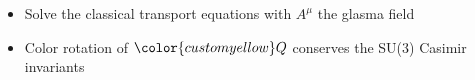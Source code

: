 \documentclass[aspectratio=169,11pt,usenames,dvipsnames]{beamer}
\begin{document}
\begin{frame}
    \begin{itemize}\itemsep0em 
        \item \begin{center}\footnotesize Solve the classical transport equations with {\color{starrysecond}$A^\mu$} the {\color{starrysecond}glasma field}\end{center} 
        \item \begin{center}\footnotesize Color rotation of ${\color{customyellow}Q}$ conserves the {\color{palgold}SU($3$) Casimir invariants} \end{center} 
    \end{itemize}
\end{frame}


\end{document}
